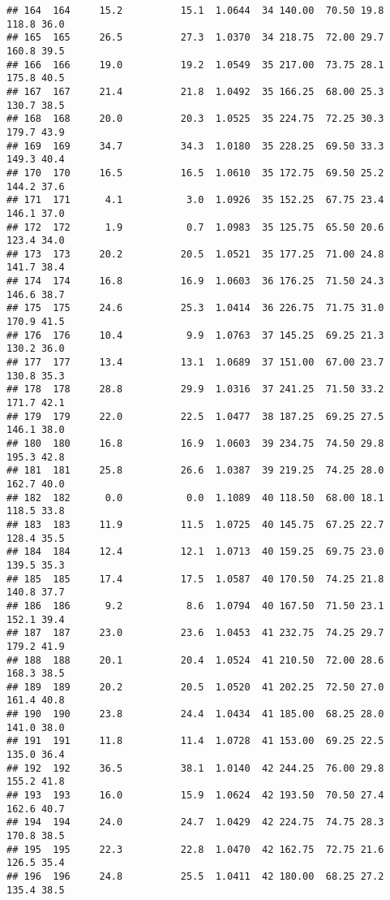 \documentclass[
]{book}
\theoremstyle{definition}
\theoremstyle{definition}
\theoremstyle{definition}
\theoremstyle{definition}
\theoremstyle{remark}
\begin{document}
\begin{verbatim}
## 164  164     15.2          15.1  1.0644  34 140.00  70.50 19.8    118.8 36.0
## 165  165     26.5          27.3  1.0370  34 218.75  72.00 29.7    160.8 39.5
## 166  166     19.0          19.2  1.0549  35 217.00  73.75 28.1    175.8 40.5
## 167  167     21.4          21.8  1.0492  35 166.25  68.00 25.3    130.7 38.5
## 168  168     20.0          20.3  1.0525  35 224.75  72.25 30.3    179.7 43.9
## 169  169     34.7          34.3  1.0180  35 228.25  69.50 33.3    149.3 40.4
## 170  170     16.5          16.5  1.0610  35 172.75  69.50 25.2    144.2 37.6
## 171  171      4.1           3.0  1.0926  35 152.25  67.75 23.4    146.1 37.0
## 172  172      1.9           0.7  1.0983  35 125.75  65.50 20.6    123.4 34.0
## 173  173     20.2          20.5  1.0521  35 177.25  71.00 24.8    141.7 38.4
## 174  174     16.8          16.9  1.0603  36 176.25  71.50 24.3    146.6 38.7
## 175  175     24.6          25.3  1.0414  36 226.75  71.75 31.0    170.9 41.5
## 176  176     10.4           9.9  1.0763  37 145.25  69.25 21.3    130.2 36.0
## 177  177     13.4          13.1  1.0689  37 151.00  67.00 23.7    130.8 35.3
## 178  178     28.8          29.9  1.0316  37 241.25  71.50 33.2    171.7 42.1
## 179  179     22.0          22.5  1.0477  38 187.25  69.25 27.5    146.1 38.0
## 180  180     16.8          16.9  1.0603  39 234.75  74.50 29.8    195.3 42.8
## 181  181     25.8          26.6  1.0387  39 219.25  74.25 28.0    162.7 40.0
## 182  182      0.0           0.0  1.1089  40 118.50  68.00 18.1    118.5 33.8
## 183  183     11.9          11.5  1.0725  40 145.75  67.25 22.7    128.4 35.5
## 184  184     12.4          12.1  1.0713  40 159.25  69.75 23.0    139.5 35.3
## 185  185     17.4          17.5  1.0587  40 170.50  74.25 21.8    140.8 37.7
## 186  186      9.2           8.6  1.0794  40 167.50  71.50 23.1    152.1 39.4
## 187  187     23.0          23.6  1.0453  41 232.75  74.25 29.7    179.2 41.9
## 188  188     20.1          20.4  1.0524  41 210.50  72.00 28.6    168.3 38.5
## 189  189     20.2          20.5  1.0520  41 202.25  72.50 27.0    161.4 40.8
## 190  190     23.8          24.4  1.0434  41 185.00  68.25 28.0    141.0 38.0
## 191  191     11.8          11.4  1.0728  41 153.00  69.25 22.5    135.0 36.4
## 192  192     36.5          38.1  1.0140  42 244.25  76.00 29.8    155.2 41.8
## 193  193     16.0          15.9  1.0624  42 193.50  70.50 27.4    162.6 40.7
## 194  194     24.0          24.7  1.0429  42 224.75  74.75 28.3    170.8 38.5
## 195  195     22.3          22.8  1.0470  42 162.75  72.75 21.6    126.5 35.4
## 196  196     24.8          25.5  1.0411  42 180.00  68.25 27.2    135.4 38.5

\end{verbatim}
\end{document}
